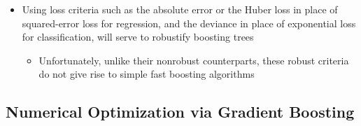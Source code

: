 \documentclass[11pt]{article}
\begin{document}
\begin{itemize}
\item Using loss criteria such as the absolute error or the Huber loss in place of squared-error loss for regression, and the deviance in place of exponential loss for classification, will serve to robustify boosting trees
\begin{itemize}
\item Unfortunately, unlike their nonrobust counterparts, these robust criteria do not give rise to simple fast boosting algorithms
\end{itemize}
\end{itemize}

\subsection{Numerical Optimization via Gradient Boosting}
\label{sec:orgfa08dbb}
\end{document}

